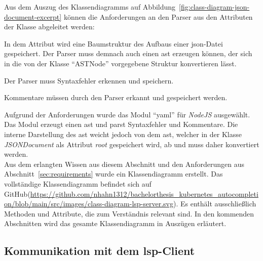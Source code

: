 Aus dem Auszug des Klassendiagramms auf Abbildung~\ref{fig:class-diagram-json-document-excerpt} können die Anforderungen an
den Parser aus den Attributen der Klasse abgeleitet werden:
\begin{description}
  \setlength\itemsep{-0.5cm}
  \item[root]
        In dem Attribut wird eine Baumstruktur des Aufbaus einer \ac{json}-Datei gespeichert. Der Parser muss demnach auch einen \ac{ast} erzeugen können,
        der sich in die von der Klasse ``ASTNode'' vorgegebene Struktur konvertieren lässt.
  \item[syntaxErrors] Der Parser muss Syntaxfehler erkennen und speichern.
  \item[comments] Kommentare müssen durch den Parser erkannt und gespeichert werden.
\end{description}

Aufgrund der Anforderungen wurde das Modul ``yaml'' für \textit{NodeJS} ausgewählt. Das Modul erzeugt einen \ac{ast} und parst Syntaxfehler und Kommentare.
Die interne Darstellung des \ac{ast} weicht jedoch von dem \ac{ast}, welcher in der Klasse \textit{JSONDocument} als Attribut \textit{root}
gespeichert wird, ab und muss daher konvertiert werden.
\\
Aus dem erlangten Wissen aus diesem Abschnitt und den Anforderungen aus Abschnitt~\ref{sec:requirements} wurde ein Klassendiagramm erstellt.
Das vollständige Klassendiagramm befindet sich auf GitHub(\url{https://github.com/nhahn1312/bachelorthesis_kubernetes_autocompletion/blob/main/src/images/class-diagram-lsp-server.svg}).
Es enthält ausschließlich Methoden und Attribute, die zum Verständnis relevant sind.
In den kommenden Abschnitten wird das gesamte Klassendiagramm in Auszügen erläutert.

\subsection{Kommunikation mit dem \acs{lsp}-Client}\label{sec:lsp-client-communication}

